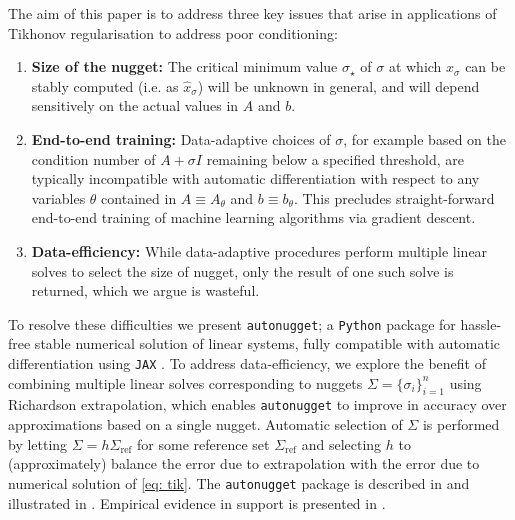 \documentclass[10pt]{article} %
\newcommand{\nugget}{\sigma}
\newcommand{\nuggets}{\Sigma}
\begin{document}
The aim of this paper is to address three key issues that arise in applications of Tikhonov regularisation to address poor conditioning: 
\begin{enumerate}
\item \textbf{Size of the nugget:}  
The critical minimum value $\nugget_{\star}$ of $\nugget$ at which $x_\nugget$ can be stably computed (i.e. as $\hat{x}_\nugget$) will be unknown in general, and will depend sensitively on the actual values in $A$ and $b$. 
\item \textbf{End-to-end training:}
Data-adaptive choices of $\nugget$, for example based on the condition number of $A + \nugget I$ remaining below a specified threshold, are typically incompatible with automatic differentiation with respect to any variables $\theta$ contained in $A \equiv A_\theta$ and $b \equiv b_\theta$.
This precludes straight-forward end-to-end training of machine learning algorithms via gradient descent.
\item \textbf{Data-efficiency:}
While data-adaptive procedures perform multiple linear solves to select the size of nugget, only the result of one such solve is returned, which we argue is wasteful.
\end{enumerate}

To resolve these difficulties we present \texttt{autonugget}; a \texttt{Python} package for hassle-free stable numerical solution of linear systems, fully compatible with automatic differentiation using \texttt{JAX} \citep{jax2018github}. 
To address data-efficiency, we explore the benefit of combining multiple linear solves corresponding to nuggets $\nuggets = \{\nugget_i\}_{i=1}^n$ using Richardson extrapolation, which enables \texttt{autonugget} to improve in accuracy over approximations based on a single nugget.
Automatic selection of $\nuggets$ is performed by letting $\nuggets = h \nuggets_{\mathrm{ref}}$ for some reference set $\nuggets_{\mathrm{ref}}$ and selecting $h$ to (approximately) balance the error due to extrapolation with the error due to numerical solution of \eqref{eq: tik}.
The \texttt{autonugget} package is described in  and illustrated in .
Empirical evidence in support is presented in .
\end{document}
